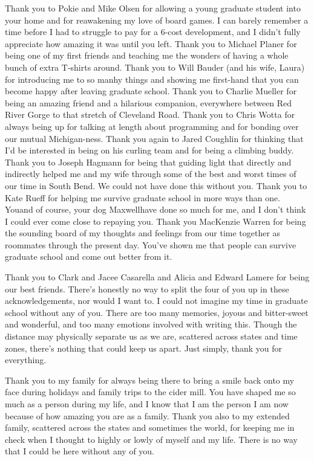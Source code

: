 \begin{acknowledge}
Thank you to Pokie and Mike Olsen for allowing a young graduate student
into your home and for reawakening my love of board games. I can barely
remember a time before I had to struggle to pay for a 6-cost
development, and I didn't fully appreciate how amazing it was until you
left. Thank you to Michael Planer for being one of my first friends and
teaching me the wonders of having a whole bunch of extra T-shirts
around. Thank you to Will Bauder (and his wife, Laura) for introducing
me to so manhy things and showing me first-hand that you can become
happy after leaving graduate school. Thank you to Charlie Mueller for
being an amazing friend and a hilarious companion, everywhere between
Red River Gorge to that stretch of Cleveland Road. Thank you to Chris
Wotta for always being up for talking at length about programming and
for bonding over our mutual Michigan-ness. Thank you again to Jared
Coughlin for thinking that I'd be interested in being on his curling
team and for being a climbing buddy. Thank you to Joseph Hagmann for
being that guiding light that directly and indirectly helped me and my
wife through some of the best and worst times of our time in South Bend.
We could not have done this without you. Thank you to Kate Rueff for
helping me survive graduate school in more ways than one.
You\textemdash{}and of course, your dog Maxwell\textemdash{}have done so
much for me, and I don't think I could ever come close to repaying you.
Thank you MacKenzie Warren for being the sounding board of my thoughts
and feelings from our time together as roommates through the present
day. You've shown me that people can survive graduate school and come
out better from it.

Thank you to Clark and Jacee Casarella and Alicia and Edward Lamere for
being our best friends. There's honestly no way to split the four of you
up in these acknowledgements, nor would I want to. I could not imagine
my time in graduate school without any of you. There are too many
memories, joyous and bitter-sweet and wonderful, and too many emotions
involved with writing this. Though the distance may physically separate
us as we are, scattered across states and time zones, there's nothing
that could keep us apart. Just simply, thank you for everything.

Thank you to my family for always being there to bring a smile back onto
my face during holidays and family trips to the cider mill. You have
shaped me so much as a person during my life, and I know that I am the
person I am now because of how amazing you are as a family. Thank you
also to my extended family, scattered across the states and sometimes
the world, for keeping me in check when I thought to highly or lowly of
myself and my life. There is no way that I could be here without any of
you.


\end{acknowledge}
